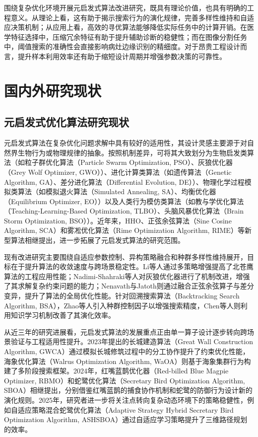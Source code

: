 围绕复杂优化环境开展元启发式算法改进研究，既具有理论价值，也具有明确的工程意义。从理论上看，这有助于揭示搜索行为的演化规律，完善多样性维持和自适应决策机制\cite{ibsa_ref75}；从应用上看，高效的寻优算法能够降低实际任务中的计算开销。在医学特征选择中，压缩冗余特征有助于提升辅助诊断的稳健性；而在图像分割任务中，阈值搜索的准确性会直接影响病灶边缘识别的精细度。对于昂贵工程设计而言，提升样本利用效率还有助于缩短设计周期并增强参数决策的可靠性\cite{ibsa_ref49,sbo_ref79,kudela2022recent}。

\section{国内外研究现状}

\subsection{元启发式优化算法研究现状}

元启发式算法在复杂优化问题求解中具有较好的适用性，其设计灵感主要源于对自然界生物行为或物理规律的抽象。按照机制差异，可将其大致划分为生物启发类算法（如粒子群优化算法（Particle Swarm Optimization, PSO）\cite{ibsa_ref26}、灰狼优化器（Grey Wolf Optimizer, GWO）\cite{ibsa_ref81}）、进化计算类算法（如遗传算法（Genetic Algorithm, GA）\cite{ibsa_ref33}、差分进化算法（Differential Evolution, DE）\cite{ibsa_ref34}）、物理化学过程模拟类算法（如模拟退火算法（Simulated Annealing, SA）\cite{ibsa_ref29}、均衡优化器（Equilibrium Optimizer, EO）\cite{ibsa_ref32}）以及人类行为模仿类算法（如教与学优化算法（Teaching-Learning-Based Optimization, TLBO）\cite{ibsa_ref37}、头脑风暴优化算法（Brain Storm Optimization, BSO）\cite{ibsa_ref40}）。近年来，HHO\cite{ibsa_ref83}、正弦余弦算法（Sine Cosine Algorithm, SCA）\cite{ibsa_ref31}和雾凇优化算法（Rime Optimization Algorithm, RIME）\cite{sbo_ref49}等新型算法相继提出，进一步拓展了元启发式算法的研究范围。

现有改进研究主要围绕自适应参数控制、异构策略融合和种群多样性维持展开，目标在于提升算法的收敛速度与跨场景稳定性。Li等人\cite{ibsa_ref76}通过多策略增强提高了北苍鹰算法的工程应用性能；Nadimi-Shahraki等人\cite{ibsa_ref88}对灰狼优化器进行了机制改进，增强了其求解复杂约束问题的能力；Nenavath与Jatoth\cite{ibsa_ref87}则通过融合正弦余弦算子与差分变异，提升了算法的全局优化性能。针对回溯搜索算法（Backtracking Search Algorithm, BSA），Zhao等人\cite{ibsa_ref57}引入种群控制因子以增强搜索精度，Chen等人\cite{ibsa_ref63}则利用知识学习机制改善了其演化效率。

从近三年的研究进展看，元启发式算法的发展重点正由单一算子设计逐步转向跨场景验证与工程适用性提升。2023年提出的长城建造算法（Great Wall Construction Algorithm, GWCA）通过模拟长城修筑过程中的分工协作提升了约束优化性能，海象优化算法（Walrus Optimization Algorithm, WaOA）则基于海象集群行为构建了多阶段搜索框架\cite{gwca2023,waoa2023}。2024年，红嘴蓝鹊优化器（Red-billed Blue Magpie Optimizer, RBMO）和蛇鹭优化算法（Secretary Bird Optimization Algorithm, SBOA）相继提出，分别借鉴红嘴蓝鹊的捕食协作机制和蛇鹭的防御行为设计新的演化规则\cite{rbmo2024,sboa2024}。2025年，研究者进一步将关注点转向复杂动态环境下的策略稳健性，例如自适应策略混合蛇鹭优化算法（Adaptive Strategy Hybrid Secretary Bird Optimization Algorithm, ASHSBOA）通过自适应学习策略提升了三维路径规划的效率\cite{ashsboa2025}。

